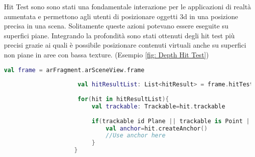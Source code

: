\documentclass[crop=false, class=book]{standalone}
\begin{document}
		Hit Test sono sono stati una fondamentale interazione per le applicazioni di realtà aumentata e permettono agli utenti 			di posizionare oggetti 3d in una posizione precisa in una scena. Solitamente queste azioni potevano essere eseguite su 			superfici piane. Integrando la profondità sono stati ottenuti degli hit test più precisi grazie ai quali è possibile  			posizionare contenuti virtuali anche su superfici non piane in aree con bassa texture. (Esempio \vref{fig: Depth Hit Test})\\

		\begin{center}
				\begin{minipage}{0.95\textwidth}
					\begin{lstlisting}[caption={Depth Hit Test}, label={lst: Depth Hit Test}, language=Kotlin]
					 val frame = arFragment.arSceneView.frame
					
					 val hitResultList: List<hitResult> = frame.hitTest(tap)
					
					 for(hit in hitResultList){
						 val trackable: Trackable=hit.trackable
						
						 if(trackable id Plane || trackable is Point || trackable is DepthPoint){
							 val anchor=hit.createAnchor()
							 //Use anchor here
						 }
					}
					
				\end{lstlisting}
			\end{minipage}
		\end{center}
\end{document}
